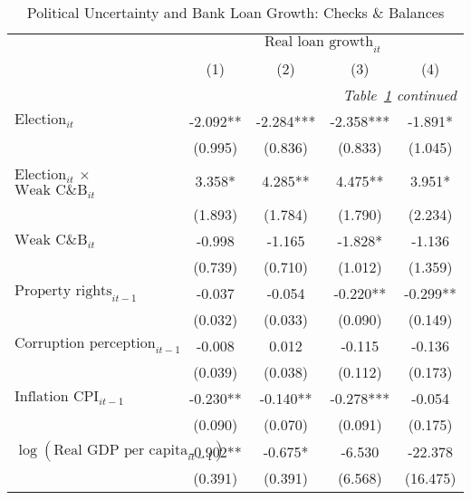 \begin{longtable}{m{8cm}*{4}{c}}                                         \caption{Political Uncertainty and Bank Loan Growth: Checks \& Balances \label{cbloans}}\\                                         \toprule                                         &\multicolumn{4}{c}{$\text{Real loan growth}_{it}$} \\ \cmidrule(lr){2-5}
                    &         (1)   &         (2)   &         (3)   &         (4)   \\
\midrule\endfirsthead                                         \multicolumn{5}{r}{\textit{Table~\ref{cbloans} continued}} \\                                         \toprule\endhead\midrule\endfoot\endlastfoot
$\text{Election}_{it}$&      -2.092** &      -2.284***&      -2.358***&      -1.891*  \\
                    &     (0.995)   &     (0.836)   &     (0.833)   &     (1.045)   \\
$\text{Election}_{it}$ $\times$ $\text{Weak C\&B}_{it}$&       3.358*  &       4.285** &       4.475** &       3.951*  \\
                    &     (1.893)   &     (1.784)   &     (1.790)   &     (2.234)   \\
$\text{Weak C\&B}_{it}$&      -0.998   &      -1.165   &      -1.828*  &      -1.136   \\
                    &     (0.739)   &     (0.710)   &     (1.012)   &     (1.359)   \\
$\text{Property rights}_{it-1}$&      -0.037   &      -0.054   &      -0.220** &      -0.299** \\
                    &     (0.032)   &     (0.033)   &     (0.090)   &     (0.149)   \\
$\text{Corruption perception}_{it-1}$&      -0.008   &       0.012   &      -0.115   &      -0.136   \\
                    &     (0.039)   &     (0.038)   &     (0.112)   &     (0.173)   \\
$\text{Inflation CPI}_{it-1}$&      -0.230** &      -0.140** &      -0.278***&      -0.054   \\
                    &     (0.090)   &     (0.070)   &     (0.091)   &     (0.175)   \\
$\log(\text{Real GDP per capita}_{it-1})$&      -0.902** &      -0.675*  &      -6.530   &     -22.378   \\
                    &     (0.391)   &     (0.391)   &     (6.568)   &    (16.475)   \\

\end{longtable}
